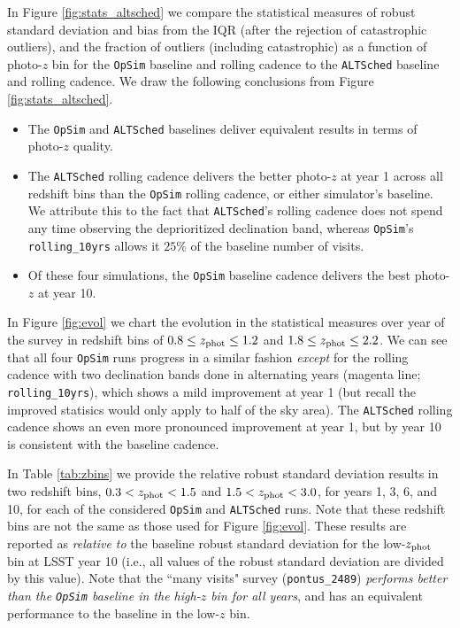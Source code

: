 In Figure \ref{fig:stats_altsched} we compare the statistical measures of robust standard deviation and bias from the IQR (after the rejection of catastrophic outliers), and the fraction of outliers (including catastrophic) as a function of photo-$z$ bin for the {\tt OpSim} baseline and rolling cadence to the {\tt ALTSched} baseline and rolling cadence. We draw the following conclusions from Figure \ref{fig:stats_altsched}. 
\begin{itemize}
\item The {\tt OpSim} and {\tt ALTSched} baselines deliver equivalent results in terms of photo-$z$ quality.
\item The {\tt ALTSched} rolling cadence delivers the better photo-$z$ at year 1 across all redshift bins than the {\tt OpSim} rolling cadence, or either simulator's baseline. We attribute this to the fact that {\tt ALTSched}'s rolling cadence does not spend any time observing the deprioritized declination band, whereas {\tt OpSim}'s {\tt rolling\_10yrs} allows it $25\%$ of the baseline number of visits.
\item Of these four simulations, the {\tt OpSim} baseline cadence delivers the best photo-$z$ at year 10.
\end{itemize}

In Figure \ref{fig:evol} we chart the evolution in the statistical measures over year of the survey in redshift bins of $0.8 \leq z_{\rm phot} \leq 1.2$  and $1.8 \leq z_{\rm phot} \leq 2.2$. We can see that all four {\tt OpSim} runs progress in a similar fashion {\it except} for the rolling cadence with two declination bands done in alternating years (magenta line; {\tt rolling\_10yrs}), which shows a mild improvement at year 1 (but recall the improved statisics would only apply to half of the sky area). The {\tt ALTSched} rolling cadence shows an even more pronounced improvement at year 1, but by year 10 is consistent with the baseline cadence.

In Table \ref{tab:zbins} we provide the relative robust standard deviation results in two redshift bins, $0.3<z_{\rm phot}<1.5$ and $1.5<z_{\rm phot}<3.0$, for years 1, 3, 6, and 10, for each of the considered {\tt OpSim} and {\tt ALTSched} runs. Note that these redshift bins are not the same as those used for Figure \ref{fig:evol}. These results are reported as {\it relative to} the baseline robust standard deviation for the low-$z_{\rm phot}$ bin at LSST year 10 (i.e., all values of the robust standard deviation are divided by this value). Note that the ``many visits" survey ({\tt pontus\_2489}) {\it performs better than the {\tt OpSim} baseline in the high-$z$ bin for all years}, and has an equivalent performance to the baseline in the low-$z$ bin.

